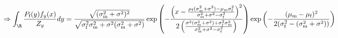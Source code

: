 \documentclass{article}\usepackage[]{graphicx}\usepackage[]{color}
\newcommand{\x}[1]{\text{#1}}
\begin{document}
\begin{landscape}
\begin{align*}
\\\Rightarrow \int_\R \frac{P_\x{f}(y)f_y(x)}{Z_y} dy&=\frac{\sqrt{(\sigma_\x{m}^2+\sigma^2)^2}}{\sqrt{\sigma_\x{f}^2\sigma_\x{m}^2+\sigma^2(\sigma_\x{m}^2+\sigma^2)}}\exp\left(-\frac{\left(x-\frac{\mu_\x{f}(\sigma_\x{m}^2+\sigma^2)-\mu_\x{m}\sigma_\x{f}^2}{\sigma_\x{m}^2+\sigma^2-\sigma_\x{f}^2}\right)^2}{2\left(\frac{\sigma^2(\sigma_\x{m}^2+\sigma^2)+\sigma_\x{f}^2\sigma_\x{m}^2}{\sigma_\x{m}^2+\sigma^2-\sigma_\x{f}^2}\right)}\right)\exp\left(-\frac{(\mu_\x{m}-\mu_\x{f})^2}{2(\sigma_\x{f}^2-(\sigma_\x{m}^2+\sigma^2))}\right)
\end{align*}
\end{landscape}
\end{document}
